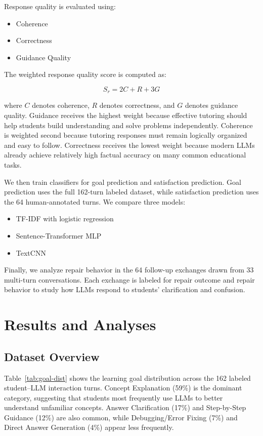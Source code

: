 Response quality is evaluated using:

\begin{itemize}
    \item Coherence
    \item Correctness
    \item Guidance Quality
\end{itemize}

The weighted response quality score is computed as:

\[
S_r = 2C + R + 3G
\]

where $C$ denotes coherence, $R$ denotes correctness, and $G$ denotes guidance quality. Guidance receives the highest weight because effective tutoring should help students build understanding and solve problems independently. Coherence is weighted second because tutoring responses must remain logically organized and easy to follow. Correctness receives the lowest weight because modern LLMs already achieve relatively high factual accuracy on many common educational tasks.

We then train classifiers for goal prediction and satisfaction prediction. Goal prediction uses the full 162-turn labeled dataset, while satisfaction prediction uses the 64 human-annotated turns. We compare three models:

\begin{itemize}
    \item TF-IDF with logistic regression
    \item Sentence-Transformer MLP
    \item TextCNN
\end{itemize}

Finally, we analyze repair behavior in the 64 follow-up exchanges drawn from 33 multi-turn conversations. Each exchange is labeled for repair outcome and repair behavior to study how LLMs respond to students' clarification and confusion.

\section{Results and Analyses}

\subsection{Dataset Overview}

Table~\ref{tab:goal-dist} shows the learning goal distribution across the 162 labeled student--LLM interaction turns. Concept Explanation (59\%) is the dominant category, suggesting that students most frequently use LLMs to better understand unfamiliar concepts. Answer Clarification (17\%) and Step-by-Step Guidance (12\%) are also common, while Debugging/Error Fixing (7\%) and Direct Answer Generation (4\%) appear less frequently.


